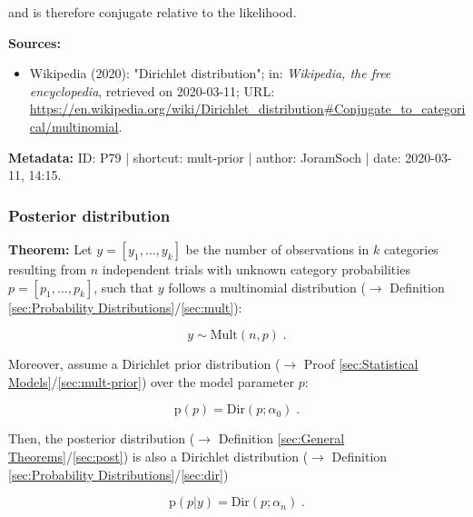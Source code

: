 \documentclass[a4paper,12pt,twoside]{book}
\begin{document}
and is therefore conjugate relative to the likelihood.


\vspace{1em}
\textbf{Sources:}
\begin{itemize}
\item Wikipedia (2020): "Dirichlet distribution"; in: \textit{Wikipedia, the free encyclopedia}, retrieved on 2020-03-11; URL: \url{https://en.wikipedia.org/wiki/Dirichlet_distribution#Conjugate_to_categorical/multinomial}.
\end{itemize}


\vspace{1em}
\textbf{Metadata:} ID: P79 | shortcut: mult-prior | author: JoramSoch | date: 2020-03-11, 14:15.
\vspace{1em}



\subsubsection[\textbf{Posterior distribution}]{Posterior distribution} \label{sec:mult-post}
\setcounter{equation}{0}

\textbf{Theorem:} Let $y = [y_1, \ldots, y_k]$ be the number of observations in $k$ categories resulting from $n$ independent trials with unknown category probabilities $p = [p_1, \ldots, p_k]$, such that $y$ follows a multinomial distribution ($\rightarrow$ Definition \ref{sec:Probability Distributions}/\ref{sec:mult}):

\begin{equation} \label{eq:mult-post-Mult}
y \sim \mathrm{Mult}(n,p) \; .
\end{equation}

Moreover, assume a Dirichlet prior distribution ($\rightarrow$ Proof \ref{sec:Statistical Models}/\ref{sec:mult-prior}) over the model parameter $p$:

\begin{equation} \label{eq:mult-post-Mult-prior}
\mathrm{p}(p) = \mathrm{Dir}(p; \alpha_0) \; .
\end{equation}

Then, the posterior distribution ($\rightarrow$ Definition \ref{sec:General Theorems}/\ref{sec:post}) is also a Dirichlet distribution ($\rightarrow$ Definition \ref{sec:Probability Distributions}/\ref{sec:dir})

\begin{equation} \label{eq:mult-post-Mult-post}
\mathrm{p}(p|y) = \mathrm{Dir}(p; \alpha_n) \; .
\end{equation}
\end{document}
